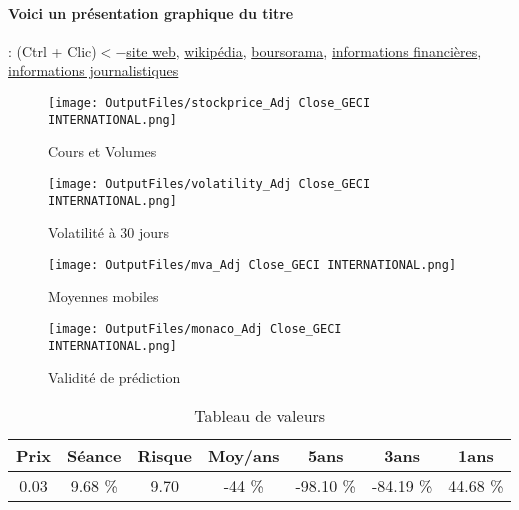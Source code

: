 \documentclass[11pt,a4paper]{report}%
\begin{document}
\paragraph{Voici un présentation graphique du titre} : (Ctrl + Clic)$<-$\href{http://www.geci.net/}{site web}, \href{https://fr.wikipedia.org/wiki/GECI_International}{wikipédia}, \href{https://www.boursorama.com/cours/1rPGECP}{boursorama}, \href{https://www.qwant.com/?q=site:https:%2f%2fwww.easybourse.com%2faction-societe%2fGECI-INTERNATIONAL&t=web&client=ext-firefox-hp}{informations financières}, \href{https://bourse.lerevenu.com/cours-de-bourse/fiche-valeur-synthese/GECI-INTERNATIONAL/GECP-FR}{informations journalistiques}
\begin{figure}[!htb]
   \begin{minipage}{0.5\textwidth}
     \centering
     \texttt{[image: OutputFiles/stockprice\_Adj Close\_GECI INTERNATIONAL.png]}
     \caption{Cours et Volumes}\label{Fig:price_GECI INTERNATIONAL}
   \end{minipage}\hfill
   \begin{minipage}{0.5\textwidth}
     \centering
     \texttt{[image: OutputFiles/volatility\_Adj Close\_GECI INTERNATIONAL.png]}
     \caption{Volatilité à 30 jours}\label{Fig:volat_GECI INTERNATIONAL}
   \end{minipage}
\end{figure}
\begin{figure}[!htb]
   \begin{minipage}{0.5\textwidth}
     \centering
     \texttt{[image: OutputFiles/mva\_Adj Close\_GECI INTERNATIONAL.png]}
     \caption{Moyennes mobiles}\label{Fig:mva_GECI INTERNATIONAL}
   \end{minipage}\hfill
   \begin{minipage}{0.5\textwidth}
     \centering
     \texttt{[image: OutputFiles/monaco\_Adj Close\_GECI INTERNATIONAL.png]}
     \caption{Validité de prédiction}\label{Fig:prediction_GECI INTERNATIONAL}
   \end{minipage}
\end{figure}

\begin{table}[H]
  \centering
    \begin{tabular}{|c|c|c|c|c|c|c|}
    \hline
    Prix & Séance & Risque  & Moy/ans & 5ans & 3ans & 1ans \\
    \hline
    0.03 &    9.68 \%    & 9.70 & -44 \% & -98.10 \% & -84.19 \% & 44.68 \% \\
    \hline
    \end{tabular}%
        \label{tab:table_GECI INTERNATIONAL}%
      \caption{Tableau de valeurs}
\end{table}%
\end{document}
